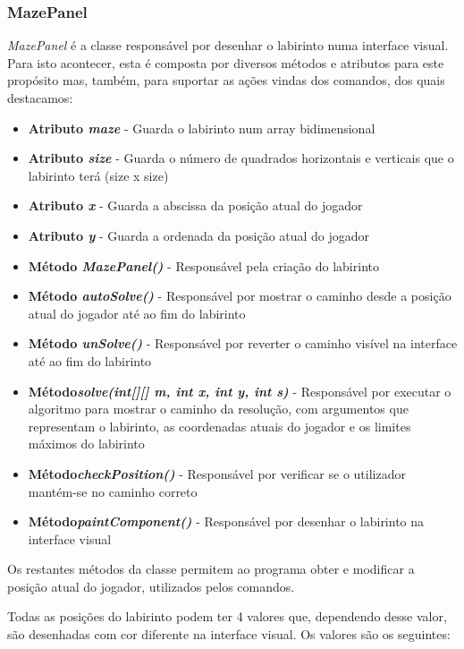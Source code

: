 \documentclass[10pt,portuguese]{article}
\begin{document}
\subsubsection{MazePanel}

\par \textit{MazePanel} é a classe responsável por desenhar o labirinto numa interface visual. Para isto acontecer, esta é composta por diversos métodos e atributos para este propósito mas, também, para suportar as ações vindas dos comandos, dos quais destacamos:

\begin{itemize}
    \item \textbf{Atributo \textit{maze}} - Guarda o labirinto num array bidimensional
    \item \textbf{Atributo \textit{size}} - Guarda o número de quadrados horizontais e verticais que o labirinto terá (size x size)
    \item \textbf{Atributo \textit{x}} - Guarda a abscissa da posição atual do jogador
    \item \textbf{Atributo \textit{y}} - Guarda a ordenada da posição atual do jogador
    \item \textbf{Método \textit{MazePanel()}} - Responsável pela criação do labirinto
    \item \textbf{Método \textit{autoSolve()}} - Responsável por mostrar o caminho desde a posição atual do jogador até ao fim do labirinto
    \item \textbf{Método \textit{unSolve()}} - Responsável por reverter o caminho visível na interface até ao fim do labirinto
    \item \textbf{Método\textit{solve(int[][] m, int x, int y, int s)}} - Responsável por executar o algoritmo para mostrar o caminho da resolução, com argumentos que representam o labirinto, as coordenadas atuais do jogador e os limites máximos do labirinto
    \item \textbf{Método\textit{checkPosition()}} - Responsável por verificar se o utilizador mantém-se no caminho correto
     \item \textbf{Método\textit{paintComponent()}} - Responsável por desenhar o labirinto na interface visual
\end{itemize}

\par Os restantes métodos da classe permitem ao programa obter e modificar a posição atual do jogador, utilizados pelos comandos. 

\par Todas as posições do labirinto podem ter 4 valores que, dependendo desse valor, são desenhadas com cor diferente na interface visual. Os valores são os seguintes:
\end{document}
